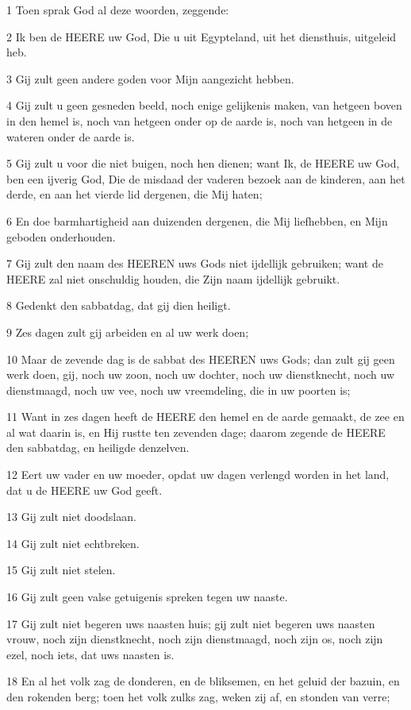 \par 1 Toen sprak God al deze woorden, zeggende:
\par 2 Ik ben de HEERE uw God, Die u uit Egypteland, uit het diensthuis, uitgeleid heb.
\par 3 Gij zult geen andere goden voor Mijn aangezicht hebben.
\par 4 Gij zult u geen gesneden beeld, noch enige gelijkenis maken, van hetgeen boven in den hemel is, noch van hetgeen onder op de aarde is, noch van hetgeen in de wateren onder de aarde is.
\par 5 Gij zult u voor die niet buigen, noch hen dienen; want Ik, de HEERE uw God, ben een ijverig God, Die de misdaad der vaderen bezoek aan de kinderen, aan het derde, en aan het vierde lid dergenen, die Mij haten;
\par 6 En doe barmhartigheid aan duizenden dergenen, die Mij liefhebben, en Mijn geboden onderhouden.
\par 7 Gij zult den naam des HEEREN uws Gods niet ijdellijk gebruiken; want de HEERE zal niet onschuldig houden, die Zijn naam ijdellijk gebruikt.
\par 8 Gedenkt den sabbatdag, dat gij dien heiligt.
\par 9 Zes dagen zult gij arbeiden en al uw werk doen;
\par 10 Maar de zevende dag is de sabbat des HEEREN uws Gods; dan zult gij geen werk doen, gij, noch uw zoon, noch uw dochter, noch uw dienstknecht, noch uw dienstmaagd, noch uw vee, noch uw vreemdeling, die in uw poorten is;
\par 11 Want in zes dagen heeft de HEERE den hemel en de aarde gemaakt, de zee en al wat daarin is, en Hij rustte ten zevenden dage; daarom zegende de HEERE den sabbatdag, en heiligde denzelven.
\par 12 Eert uw vader en uw moeder, opdat uw dagen verlengd worden in het land, dat u de HEERE uw God geeft.
\par 13 Gij zult niet doodslaan.
\par 14 Gij zult niet echtbreken.
\par 15 Gij zult niet stelen.
\par 16 Gij zult geen valse getuigenis spreken tegen uw naaste.
\par 17 Gij zult niet begeren uws naasten huis; gij zult niet begeren uws naasten vrouw, noch zijn dienstknecht, noch zijn dienstmaagd, noch zijn os, noch zijn ezel, noch iets, dat uws naasten is.
\par 18 En al het volk zag de donderen, en de bliksemen, en het geluid der bazuin, en den rokenden berg; toen het volk zulks zag, weken zij af, en stonden van verre;
